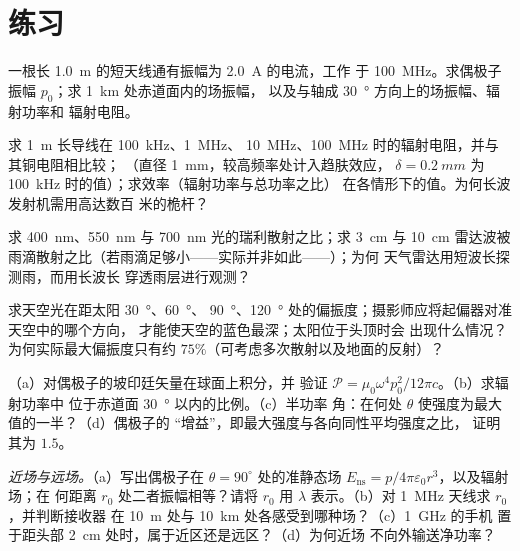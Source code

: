 \section{练习}

\begin{exercise}[$\star$]\label{exo:b2:dipole-radiation:1}
一根长 \qty{1.0}{m} 的短天线通有振幅为 \qty{2.0}{A} 的电流，工作
于 \qty{100}{MHz}。求偶极子振幅 $p_0$；求 \qty{1}{km} 处赤道面内的场振幅，
以及与轴成 \qty{30}{\degree} 方向上的场振幅、辐射功率和
辐射电阻。
\end{exercise}

\begin{exercise}[$\star$]\label{exo:b2:dipole-radiation:2}
求 \qty{1}{m} 长导线在 \qty{100}{kHz}、\qty{1}{MHz}、
\qty{10}{MHz}、\qty{100}{MHz} 时的辐射电阻，并与其铜电阻相比较；
（直径 \qty{1}{mm}，较高频率处计入趋肤效应，
$\delta = \qty{0.2}{mm}$ 为 \qty{100}{kHz} 时的值）；求效率（辐射功率与总功率之比）
在各情形下的值。为何长波发射机需用高达数百
米的桅杆？
\end{exercise}

\begin{exercise}[$\star$]\label{exo:b2:dipole-radiation:3}
求 \qty{400}{nm}、\qty{550}{nm} 与
\qty{700}{nm} 光的瑞利散射之比；求 \qty{3}{cm} 与 \qty{10}{cm} 雷达波被
雨滴散射之比（若雨滴足够小——实际并非如此——）；为何
天气雷达用短波长探测雨，而用长波长
穿透雨层进行观测？
\end{exercise}

\begin{exercise}[$\star$]\label{exo:b2:dipole-radiation:4}
求天空光在距太阳 \qty{30}{\degree}、\qty{60}{\degree}、
\qty{90}{\degree}、\qty{120}{\degree} 处的偏振度；摄影师应将起偏器对准天空中的哪个方向，
才能使天空的蓝色最深；太阳位于头顶时会
出现什么情况？为何实际最大偏振度只有约
$75\%$（可考虑多次散射以及地面的反射）？
\end{exercise}

\begin{exercise}[$\star\star$]\label{exo:b2:dipole-radiation:5}
（a）对偶极子的坡印廷矢量在球面上积分，并
验证 $\mathcal P = \mu_0\omega^4p_0^2/12\pi c$。（b）求辐射功率中
位于赤道面 \qty{30}{\degree} 以内的比例。（c）半功率
角：在何处 $\theta$ 使强度为最大值的一半？（d）偶极子的
“增益”，即最大强度与各向同性平均强度之比，
证明其为 $1.5$。
\end{exercise}

\begin{exercise}[$\star\star$]\label{exo:b2:dipole-radiation:6}
\emph{近场与远场。}（a）写出偶极子在
$\theta = 90^\circ$ 处的准静态场 $E_{\text{ns}} = p/4\pi\varepsilon_0r^3$，以及辐射场；在
何距离 $r_0$ 处二者振幅相等？请将 $r_0$ 用
$\lambda$ 表示。（b）对 \qty{1}{MHz} 天线求 $r_0$，并判断接收器
在 \qty{10}{m} 处与 \qty{10}{km} 处各感受到哪种场？（c）\qty{1}{GHz} 的手机
置于距头部 \qty{2}{cm} 处时，属于近区还是远区？（d）为何近场
不向外输送净功率？
\end{exercise}

